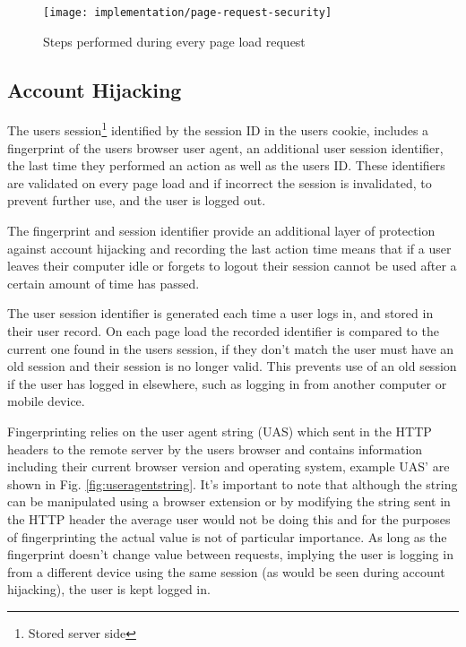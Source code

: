 \begin{figure}[h]
    \centering
    \texttt{[image: implementation/page-request-security]}
    \caption{Steps performed during every page load request}
    \label{fig:page-request-security}
    
    \begin{comment}
(start)->(Page Request)
(Page Request)->(Compare FingerPrint)
(Page Request)->(Redirect to HTTPS Equivalent)->(Compare FingerPrint)
(Compare FingerPrint)->(Compare User Session ID)
(Compare FingerPrint)->(Invalidate Session)->[Login Page]
(Compare User Session ID)->(Invalidate Session)
(Compare User Session ID)->[Requested Page]->(end)
    \end{comment}
\end{figure}


\subsection{Account Hijacking}
The users session\footnote{Stored server side} identified by the session ID in the users cookie, includes a fingerprint of the users browser user agent, an additional user session identifier, the last time they performed an action as well as the users ID. These identifiers are validated on every page load and if incorrect the session is invalidated, to prevent further use, and the user is logged out.

The fingerprint and session identifier provide an additional layer of protection against account hijacking and recording the last action time means that if a user leaves their computer idle or forgets to logout their session cannot be used after a certain amount of time has passed.

The user session identifier is generated each time a user logs in, and stored in their user record. On each page load the recorded identifier is compared to the current one found in the users session, if they don't match the user must have an old session and their session is no longer valid. This prevents use of an old session if the user has logged in elsewhere, such as logging in from another computer or mobile device.

Fingerprinting relies on the user agent string (UAS) which sent in the HTTP headers to the remote server by the users browser and contains information including their current browser version and operating system, example UAS' are shown in Fig. \ref{fig:useragentstring}. It's important to note that although the string can be manipulated using a browser extension or by modifying the string sent in the HTTP header the average user would not be doing this and for the purposes of fingerprinting the actual value is not of particular importance. As long as the fingerprint doesn't change value between requests, implying the user is logging in from a different device using the same session (as would be seen during account hijacking), the user is kept logged in.

